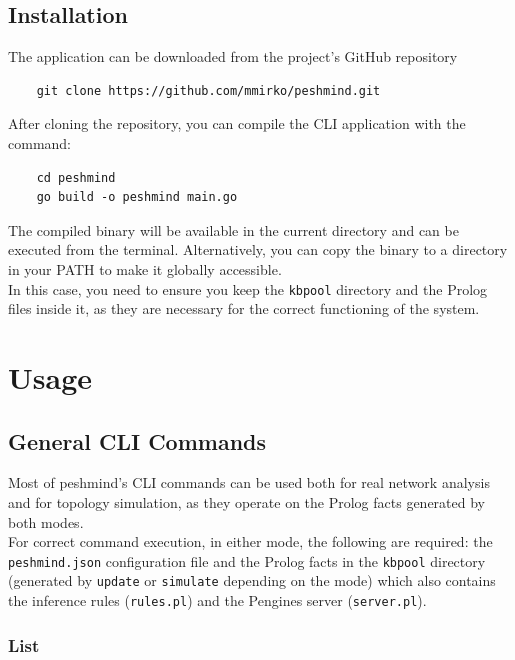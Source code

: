 \documentclass[12pt,a4paper]{article}
\begin{document}
\subsection{Installation}

The application can be downloaded from the project's GitHub repository \\

\begin{lstlisting} 
    git clone https://github.com/mmirko/peshmind.git
\end{lstlisting}

After cloning the repository, you can compile the CLI application with the command: \\
\begin{lstlisting}
    cd peshmind
    go build -o peshmind main.go
\end{lstlisting}

The compiled binary will be available in the current directory and can be executed from the terminal.
Alternatively, you can copy the binary to a directory in your PATH to make it globally accessible. \\

In this case, you need to ensure you keep the \texttt{kbpool} directory and the Prolog files inside it, as they
are necessary for the correct functioning of the system.

\section{Usage}
\subsection{General CLI Commands}

Most of peshmind's CLI commands can be used both for real network analysis and for 
topology simulation, as they operate on the Prolog facts generated by both modes. \\
For correct command execution, in either mode, the following are required: the \texttt{peshmind.json} configuration file 
and the Prolog facts in the \texttt{kbpool} directory (generated by \texttt{update} or \texttt{simulate} depending on the mode)
which also contains the inference rules (\texttt{rules.pl}) and the Pengines server (\texttt{server.pl}).

\subsubsection{List}
\end{document}
